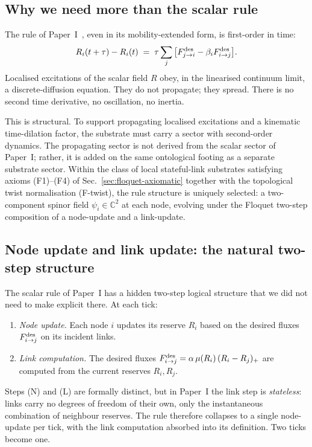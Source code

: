 \documentclass[11pt,a4paper]{article}
\begin{document}
\subsection{Why we need more than the scalar rule}

The rule of Paper~I~\cite{paperI}, even in its
mobility-extended form, is first-order in time:
\begin{equation}
R_i(t+\tau) - R_i(t) \;=\; \tau \sum_j \big[
F_{j \to i}^{\rm des} - \beta_i F_{i \to j}^{\rm des}\big].
\label{eq:scalar_rule}
\end{equation}
Localised excitations of the scalar field $R$ obey, in the
linearised continuum limit, a discrete-diffusion equation. They
do not propagate; they spread. There is no second time
derivative, no oscillation, no inertia.

This is structural. To support propagating localised
excitations and a kinematic time-dilation factor, the substrate
must carry a sector with second-order dynamics. The propagating
sector is not derived from the scalar sector of Paper~I; rather,
it is added on the same ontological footing as a separate
substrate sector. Within the class of local stateful-link
substrates satisfying axioms (F1)--(F4) of
Sec.~\ref{sec:floquet-axiomatic} together with the topological
twist normalisation (F-twist), the rule structure is uniquely
selected: a two-component spinor field $\psi_i \in \mathbb{C}^2$
at each node, evolving under the Floquet two-step composition
of a node-update and a link-update.

\subsection{Node update and link update: the natural two-step structure}
\label{sec:nodelink}

The scalar rule of Paper~I has a hidden two-step logical
structure that we did not need to make explicit there. At each
tick:
\begin{enumerate}
\item[(N)] \emph{Node update.} Each node $i$ updates its
reserve $R_i$ based on the desired fluxes
$F_{i \to j}^{\rm des}$ on its incident links.
\item[(L)] \emph{Link computation.} The desired fluxes
$F_{i \to j}^{\rm des} = \alpha\, \mu(R_i)\, (R_i - R_j)_+$
are computed from the current reserves $R_i, R_j$.
\end{enumerate}
Steps (N) and (L) are formally distinct, but in Paper~I the
link step is \emph{stateless}: links carry no degrees of
freedom of their own, only the instantaneous combination of
neighbour reserves. The rule therefore collapses to a single
node-update per tick, with the link computation absorbed into
its definition. Two ticks become one.
\end{document}

